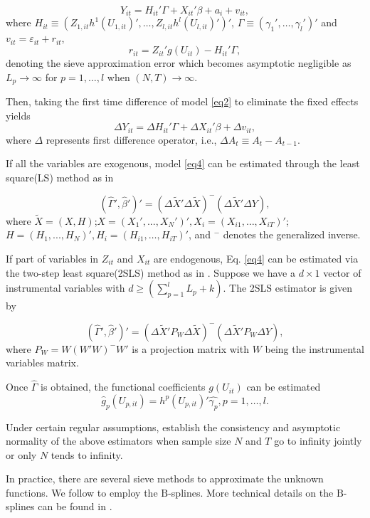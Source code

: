 \begin{equation}
Y_{it}=H_{it}'\Gamma+X_{it}'\beta+a_{i}+v_{it}, \label{eq2}
\end{equation}
where $H_{it}\equiv (Z_{1,it}h^{1}(U_{1,it})',\dots,Z_{l,it}h^{l}(U_{l,it})')'$, $\Gamma \equiv (\gamma_{1}',\dots,\gamma_{l}')'$ and $v_{it}=\varepsilon_{it}+r_{it}$,
\begin{equation}
r_{it}=Z_{it}'g(U_{it})-H_{it}'\Gamma,  \label{eq3}
\end{equation}
denoting the sieve approximation error which becomes
asymptotic negligible as $L_{p} \to \infty$ for $p=1,\dots,l$ when $(N,T) \to \infty$.


Then, taking the first time difference of model \eqref{eq2} to eliminate the fixed effects yields
 \begin{equation}
 \Delta Y_{it}=\Delta H_{it}'\Gamma+\Delta X_{it}'\beta+\Delta v_{it}, \label{eq4}
 \end{equation}
where $\Delta$ represents first difference operator, i.e., $\Delta A_{t} \equiv A_{t}-A_{t-1}$.

If all the variables are exogenous, model \eqref{eq4} can be estimated through the least square(LS) method as in \citet{yonghong2016semiparametric}

\begin{equation}
\left( \hat{\Gamma}',\hat{\beta}' \right)'=\left(\Delta \tilde{X}' \Delta \tilde{X} \right)^{-}\left(\Delta \tilde{X}' \Delta Y  \right),
\end{equation}
where $\tilde{X}=(X,H)$;$X=(X_{1}',...,X_{N}')',X_{i}=(X_{i1},\dots ,X_{iT})'$; $H=(H_{1},...,H_{N})',H_{i}=(H_{i1},\dots ,H_{iT})'$, and $^{-}$ denotes the generalized inverse.

If part of variables in $Z_{it}$ and $X_{it}$ are endogenous, Eq. \eqref{eq4} can be estimated via the two-step least square(2SLS) method as in \citet{Zhang2018}. Suppose we have a $d \times 1$ vector of instrumental variables with $d \geq (\sum_{p=1}^{l}L_{p}+k)$. The 2SLS estimator is given by

\begin{equation}
\left( \hat{\Gamma}',\hat{\beta}' \right)'=\left(\Delta \tilde{X}' P_{W} \Delta \tilde{X} \right)^{-}\left(\Delta \tilde{X}' P_{W} \Delta Y  \right),
\end{equation}
where $P_{W}=W(W'W)^{-}W'$ is a projection matrix with $W$ being the instrumental variables matrix.

Once $\hat{\Gamma}$ is obtained, the functional coefficients $g(U_{it})$ can be estimated
\begin{equation}
\hat{g}_{p}(U_{p,it})=h^{p}(U_{p,it})'\hat{\gamma_{p}},p=1,\dots,l.
\end{equation}

Under certain regular assumptions, \citet{Zhang2018} establish the consistency and asymptotic normality of the above estimators when sample size $N$ and $T$ go to infinity jointly or only $N$ tends to infinity.

In practice, there are several sieve methods to approximate the unknown functions. We follow \citet{libois2013semiparametric} to employ the $\mathrm{B}$-splines. More technical details on the $\mathrm{B}$-splines can be found in \citet{newson2001b}.

\endinput
